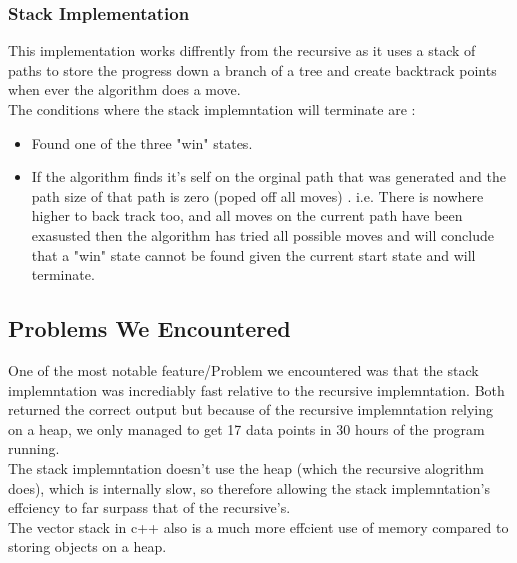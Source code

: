 \documentclass[a4paper]{article}
\begin{document}
\subsubsection{Stack Implementation}
This implementation works diffrently from the recursive as it uses a stack of paths to store the progress down a branch of a tree and create backtrack points when ever the algorithm does a move.\\
The conditions where the stack implemntation will terminate are :
\begin{itemize}
\item Found one of the three "win" states.
\item If the algorithm finds it's self on the orginal path that was generated and the path size of that path is zero (poped off all moves) . i.e. There is nowhere higher to back track too, and all moves on the current path have been exasusted then the algorithm has tried all possible moves and will conclude that a "win"  state cannot be found given the current start state and will terminate.
\end{itemize}

\subsection{Problems We Encountered}
One of the most notable feature/Problem we encountered was that the stack implemntation was incrediably fast relative to the recursive implemntation. Both returned the correct output but because of the recursive implemntation relying on a heap, we only managed to get 17 data points in 30 hours of the program running. \\
The stack implemntation doesn't use the heap (which the recursive alogrithm does), which is internally slow, so therefore allowing the stack implemntation's effciency to far surpass that of the recursive's.\\
The vector stack in c++ also is a much more effcient use of memory compared to storing objects on a heap.\\\
\end{document}
